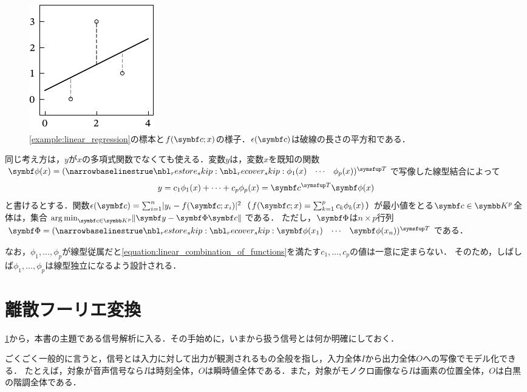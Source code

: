 \documentclass[../../main]{subfiles}
\begin{document}
\begin{figure}[htbp]
  \centering
  \includegraphics{figures/linear_regression.pdf}
  \caption{\cref{example:linear_regression}の標本と\(f(\vect{c};x)\)の様子．\(\epsilon(\vect{c})\)は破線の長さの平方和である．}
\end{figure}

同じ考え方は，\(y\)が\(x\)の多項式関数でなくても使える．変数\(y\)は，変数\(x\)を既知の関数\(\vect{\phi}(x)=\trps{\rowvect{\phi_1(x) & \cdots & \phi_p(x)}}\)で写像した線型結合によって
\begin{equation}
  \label{equation:linear_combination_of_functions}
  y = c_1\phi_1(x)+\dots+c_p\phi_p(x)
  = \trps{\vect{c}}\vect{\phi}(x)
\end{equation}
と書けるとする．関数\(\epsilon(\vect{c})=\sum_{i=1}^n\abs{y_i-f(\vect{c};x_i)}^2\)（\(f(\vect{c};x)=\sum_{k=1}^pc_k\phi_k(x)\)）が最小値をとる\(\vect{c}\in\numset{K}^p\)全体は，集合\(\argmin_{\vect{c}\in\numset{K}^p}\vnorm{\vect{y}-\mat{\Phi}\vect{c}}\)である．
ただし，\(\mat{\Phi}\)は\(n\times p\)行列\(\mat{\Phi}=\trps{\rowvect{\vect{\phi}(x_1) & \cdots & \vect{\phi}(x_n)}}\)である．

なお，\(\phi_1,\dots,\phi_p\)が線型従属だと\cref{equation:linear_combination_of_functions}を満たす\(c_1,\dots,c_p\)の値は一意に定まらない．
そのため，しばしば\(\phi_1,\dots,\phi_p\)は線型独立になるよう設計される．

\section{離散フーリエ変換}
\label{section:dft}

\cref{section:dft}から，本書の主題である信号解析に入る．その手始めに，いまから扱う信号とは何か明確にしておく．

ごくごく一般的に言うと，信号とは入力に対して出力が観測されるもの全般を指し，入力全体\(I\)から出力全体\(O\)への写像でモデル化できる．
たとえば，対象が音声信号なら\(I\)は時刻全体，\(O\)は瞬時値全体である．また，対象がモノクロ画像なら\(I\)は画素の位置全体，\(O\)は白黒の階調全体である．
\end{document}
